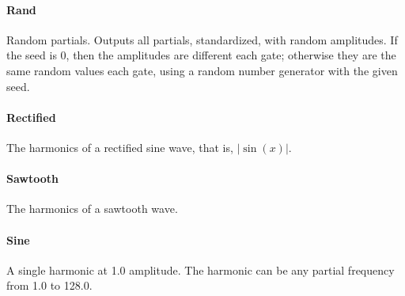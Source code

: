 \documentclass{article}
\begin{document}
\paragraph{Rand}  Random partials.  Outputs all partials, standardized, with random amplitudes.  If the seed is 0, then the amplitudes are different each gate; otherwise they are the same random values each gate, using a random number generator with the given seed.

\paragraph{Rectified}  The harmonics of a rectified sine wave, that is, \(|\sin(x)|\).

\paragraph{Sawtooth}  The harmonics of a sawtooth wave.

\paragraph{Sine}  A single harmonic at 1.0 amplitude.  The harmonic can be any partial frequency from 1.0 to 128.0.
\end{document}
